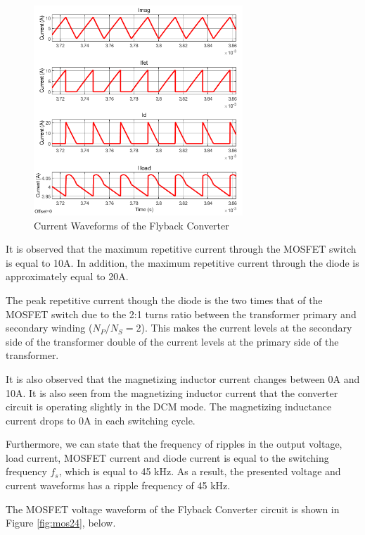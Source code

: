 \begin{figure}[H]
\begin{center}
\includegraphics[width=0.7\textwidth]{figures/currents_24.png}
\caption{Current Waveforms of the Flyback Converter}
\label{fig:currents24}
\end{center}
\end{figure}

It is observed that the maximum repetitive current through the MOSFET switch is equal to 10A. In addition, the maximum repetitive current through the diode is approximately equal to 20A.

The peak repetitive current though the diode is the two times that of the MOSFET switch due to the 2:1 turns ratio between the transformer primary and secondary winding ($N_P/N_S = 2$). This makes the current levels at the secondary side of the transformer double of the current levels at the primary side of the transformer.

It is also observed that the magnetizing inductor current changes between 0A and 10A. It is also seen from the magnetizing inductor current that the converter circuit is operating slightly in the DCM mode. The magnetizing inductance current drops to 0A in each switching cycle.

Furthermore, we can state that the frequency of ripples in the output voltage, load current, MOSFET current and diode current is equal to the switching frequency $f_s$, which is equal to 45 kHz. As a result, the presented voltage and current waveforms has a ripple frequency of 45 kHz.

The MOSFET voltage waveform of the Flyback Converter circuit is shown in Figure \ref{fig:mos24}, below.

